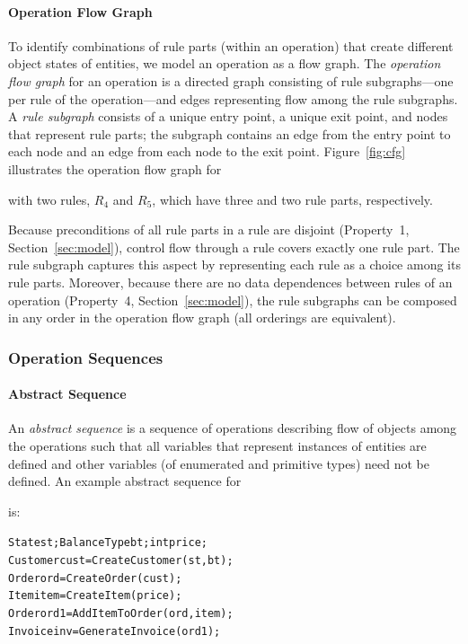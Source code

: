 \paragraph*{Operation Flow Graph} To identify combinations of rule parts (within
an operation) that create different object states of entities, we model an
operation as a flow graph. The \textit{operation flow graph} for an operation is
a directed graph consisting of rule subgraphs---one per rule of the
operation---and edges representing flow among the rule subgraphs. A \textit{rule
  subgraph} consists of a unique entry point, a unique exit point, and nodes
that represent rule parts; the subgraph contains an edge from the entry point to
each node and an edge from each node to the exit point.  Figure~\ref{fig:cfg}
illustrates the operation flow graph for \subject{GenerateInvoice} with two
rules, $R_4$ and $R_5$, which have three and two rule parts, respectively.

Because preconditions of all rule parts in a rule are disjoint (Property~1,
Section~\ref{sec:model}), control flow through a rule covers exactly one rule
part.  The rule subgraph captures this aspect by representing each rule as a
choice among its rule parts. Moreover, because there are no data dependences
between rules of an operation (Property~4, Section~\ref{sec:model}), the rule
subgraphs can be composed in any order in the operation flow graph (\ie all
orderings are equivalent).

\subsubsection{Operation Sequences}

\paragraph*{Abstract Sequence} An \textit{abstract sequence} is a sequence of
operations describing flow of objects among the operations such that all
variables that represent instances of entities are defined and other variables
(of enumerated and primitive types) need not be defined. An example abstract
sequence for \subject{GenerateInvoice} is:

\vspace*{-4pt}
{\scriptsize
\begin{alltt} 
 State st; BalanceType bt; int price;
 Customer cust = CreateCustomer(st, bt);
 Order ord = CreateOrder(cust);	 
 Item item = CreateItem(price);
 Order ord1 = AddItemToOrder(ord, item);
 Invoice inv = GenerateInvoice(ord1);  
\end{alltt}
}
\vspace*{-4pt}

